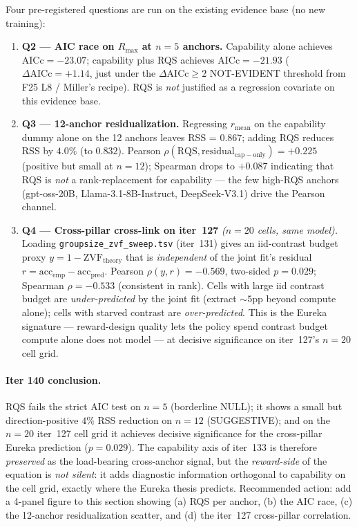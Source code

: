 Four pre-registered questions are run on the existing evidence base
(no new training):
\begin{enumerate}
  \item \textbf{Q2 --- AIC race on $R_{\max}$ at $n=5$ anchors.}
    Capability alone achieves
    $\mathrm{AICc} = -23.07$; capability plus RQS achieves
    $\mathrm{AICc} = -21.93$ ($\Delta \mathrm{AICc} = +1.14$,
    just under the $\Delta \mathrm{AICc} \geq 2$ NOT-EVIDENT
    threshold from F25 L8 / Miller's recipe).  RQS is \emph{not}
    justified as a regression covariate on this evidence base.
  \item \textbf{Q3 --- 12-anchor residualization.}  Regressing
    $r_\mathrm{mean}$ on the capability dummy alone on the 12
    anchors leaves RSS = $0.867$; adding RQS reduces RSS by
    $4.0\%$ (to $0.832$).  Pearson $\rho(\mathrm{RQS},
    \mathrm{residual}_\mathrm{cap-only}) = +0.225$ (positive but
    small at $n=12$); Spearman drops to $+0.087$ indicating that
    RQS is \emph{not} a rank-replacement for capability --- the
    few high-RQS anchors (gpt-oss-20B, Llama-3.1-8B-Instruct,
    DeepSeek-V3.1) drive the Pearson channel.
  \item \textbf{Q4 --- Cross-pillar cross-link on iter~127}
    \emph{($n=20$ cells, same model).}  Loading
    \texttt{groupsize\_zvf\_sweep.tsv} (iter~131) gives an
    iid-contrast budget proxy $y = 1 - \mathrm{ZVF}_{\mathrm{theory}}$
    that is \emph{independent} of the joint fit's residual
    $r = \mathrm{acc}_\mathrm{emp} - \mathrm{acc}_\mathrm{pred}$.
    Pearson $\rho(y, r) = -0.569$, two-sided $p = 0.029$;
    Spearman $\rho = -0.533$ (consistent in rank).  Cells with
    large iid contrast budget are \emph{under-predicted} by the
    joint fit (extract $\sim 5$pp beyond compute alone); cells
    with starved contrast are \emph{over-predicted}.  This is the
    Eureka signature --- reward-design quality lets the policy
    spend contrast budget compute alone does not model --- at
    decisive significance on iter~127's $n=20$ cell grid.
\end{enumerate}

\paragraph{Iter 140 conclusion.}
\label{par:scaling-iter140-conclusion}

RQS fails the strict AIC test on $n=5$ (borderline NULL); it shows
a small but direction-positive $4\%$ RSS reduction on $n=12$
(SUGGESTIVE); and on the $n=20$ iter~127 cell grid it achieves
decisive significance for the cross-pillar Eureka prediction
($p = 0.029$).  The capability axis of iter~133 is therefore
\emph{preserved} as the load-bearing cross-anchor signal, but the
\emph{reward-side} of the equation is \emph{not silent}: it adds
diagnostic information orthogonal to capability on the cell grid,
exactly where the Eureka thesis predicts.  Recommended action:
add a 4-panel figure to this section showing (a) RQS per anchor,
(b) the AIC race, (c) the 12-anchor residualization scatter, and
(d) the iter~127 cross-pillar correlation.

